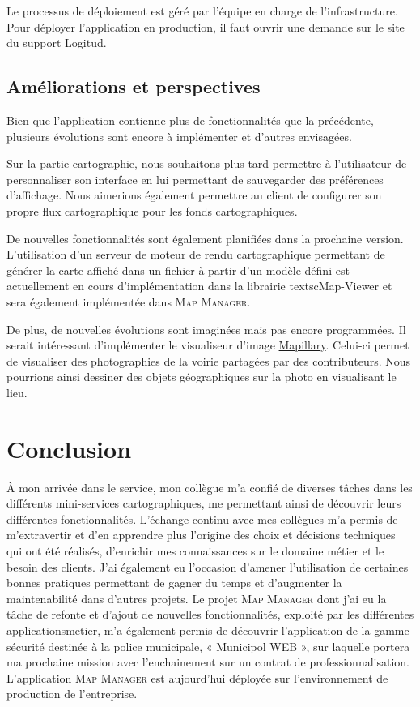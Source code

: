 \documentclass{rapportUHA40}
\begin{document}
Le processus de déploiement est géré par l'équipe en charge de
l'infrastructure. Pour déployer l'application en production, il faut ouvrir une
demande sur le site du support Logitud.

\subsection{Améliorations et perspectives}
Bien que l'application contienne plus de fonctionnalités que la précédente,
plusieurs évolutions sont encore à implémenter et d'autres envisagées.

Sur la partie cartographie, nous souhaitons plus tard permettre à l'utilisateur
de personnaliser son interface en lui permettant de sauvegarder des préférences
d'affichage. Nous aimerions également permettre au client de configurer son
propre flux cartographique pour les fonds cartographiques.

De nouvelles fonctionnalités sont également planifiées dans la prochaine
version. L'utilisation d'un serveur de moteur de rendu cartographique
permettant de générer la carte affiché dans un fichier à partir d'un modèle
défini est actuellement en cours d'implémentation dans la librairie
textsc{Map-Viewer} et sera également implémentée dans \textsc{Map Manager}.

De plus, de nouvelles évolutions sont imaginées mais pas encore programmées. Il
serait intéressant d'implémenter le visualiseur d'image
\href{https://www.mapillary.com/app/}{Mapillary}. Celui-ci permet de visualiser
des photographies de la voirie partagées par des contributeurs. Nous pourrions
ainsi dessiner des objets géographiques sur la photo en visualisant le lieu.

\section{Conclusion}
À mon arrivée dans le service, mon collègue m’a confié de diverses tâches dans
les différents mini-services cartographiques, me permettant ainsi de découvrir
leurs différentes fonctionnalités. L'échange continu avec mes collègues m'a
permis de m'extravertir et d’en apprendre plus l’origine des choix et décisions
techniques qui ont été réalisés, d’enrichir mes connaissances sur le domaine
métier et le besoin des clients. J’ai également eu l’occasion d’amener
l’utilisation de certaines bonnes pratiques permettant de gagner du temps et
d’augmenter la maintenabilité dans d'autres projets. Le projet \textsc{Map
  Manager} dont j'ai eu la tâche de refonte et d'ajout de nouvelles
fonctionnalités, exploité par les différentes \gls{applicationsmetier}, m’a
également permis de découvrir l’application de la gamme sécurité destinée à la
police municipale, « Municipol WEB », sur laquelle portera ma prochaine mission
avec l’enchainement sur un contrat de professionnalisation. L'application
\textsc{Map Manager} est aujourd'hui déployée sur l'environnement de production
de l'entreprise.
\end{document}

